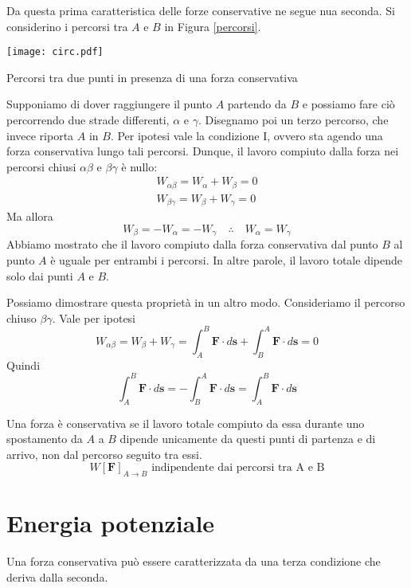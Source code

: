 \noindent Da questa prima caratteristica delle forze conservative ne segue nua
seconda. Si considerino i percorsi tra $A$ e $B$ in Figura \ref{percorsi}.
\begin{marginfigure}
    \centering
    \texttt{[image: circ.pdf]}
    \caption{Percorsi tra due punti in presenza di una forza conservativa}
    \label{percorsi}
\end{marginfigure}
Supponiamo di dover raggiungere il punto $A$ partendo da $B$ e possiamo fare
ciò percorrendo due strade differenti, $\alpha$ e $\gamma$. Disegnamo poi un
terzo percorso, che invece riporta $A$ in $B$.
Per ipotesi vale la condizione I, ovvero sta agendo una forza conservativa
lungo tali percorsi. Dunque, il lavoro compiuto dalla forza nei percorsi chiusi
$\alpha\beta$ e $\beta\gamma$ è nullo:
\begin{align*}
    W_{\alpha\beta} = W_\alpha + W_\beta = 0\\
    W_{\beta\gamma} = W_\beta + W_\gamma = 0
\end{align*}
Ma allora
\[ W_\beta = -W_\alpha = -W_\gamma \quad \therefore \quad W_\alpha = W_\gamma \]
Abbiamo mostrato che il lavoro compiuto dalla forza conservativa dal punto $B$
al punto $A$ è uguale per entrambi i percorsi. In altre parole, il lavoro totale
dipende solo dai punti $A$ e $B$.

Possiamo dimostrare questa proprietà in un altro modo. Consideriamo il percorso
chiuso $\beta\gamma$. Vale per ipotesi
\[ W_{\alpha\beta} = W_\beta + W_\gamma = \int_{A}^{B}\mathbf{F}\cdot d\mathbf{s} + \int_{B}^{A}\mathbf{F}\cdot d\mathbf{s} = 0 \]
Quindi 
\[ \int_{A}^{B}\mathbf{F}\cdot d\mathbf{s} = - \int_{B}^{A}\mathbf{F}\cdot d\mathbf{s} = \int_{A}^{B}\mathbf{F}\cdot d\mathbf{s} \]

\vspace{8pt}
\begin{tcolorbox}[colback = red!30, colframe = red!30!black, title = {Forza conservativa (condizione II)}]
    Una forza è conservativa se il lavoro totale compiuto da essa durante uno spostamento
    da $A$ a $B$ dipende unicamente da questi punti di partenza e di arrivo, non
    dal percorso seguito tra essi.
    \[ W[\mathbf{F}]_{A\to B} \text{ indipendente dai percorsi tra A e B} \]
\end{tcolorbox}
\vspace{5pt}

\section{Energia potenziale}
Una forza conservativa può essere caratterizzata da una terza condizione che deriva
dalla seconda.

